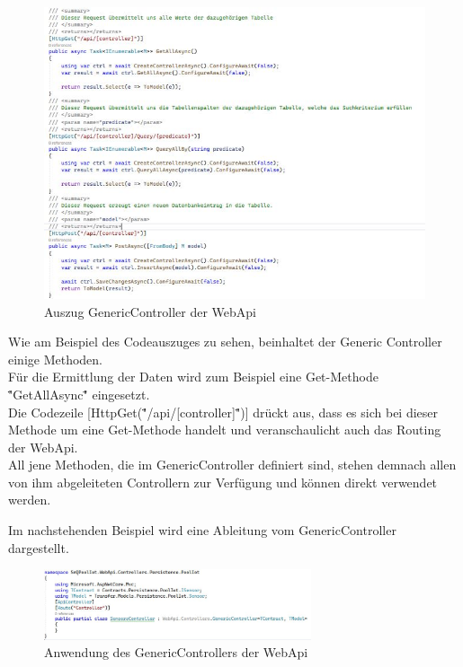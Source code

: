 \begin{figure}[H]
    \centering
    \includegraphics[width=1\textwidth]{pics/GenericControllerWebApi.JPG}
    \caption{Auszug GenericController der WebApi}
\end{figure}

Wie am Beispiel des Codeauszuges zu sehen, beinhaltet der Generic Controller einige Methoden.
\\Für die Ermittlung der Daten wird zum Beispiel eine Get-Methode \""GetAllAsync\""  eingesetzt.
\\Die Codezeile [HttpGet(\""/api/[controller]\"")] drückt aus, dass es sich bei dieser Methode um eine Get-Methode handelt 
und veranschaulicht auch das Routing der WebApi.
\\All jene Methoden, die im GenericController definiert sind, stehen demnach allen von ihm abgeleiteten Controllern zur Verfügung und können direkt verwendet werden.

Im nachstehenden Beispiel wird eine Ableitung vom GenericController dargestellt.

\begin{figure}[H]
    \centering
    \includegraphics[width=0.7\textwidth]{pics/VerwendungGenereicController.JPG}
    \caption{Anwendung des GenericControllers der WebApi}
\end{figure}


